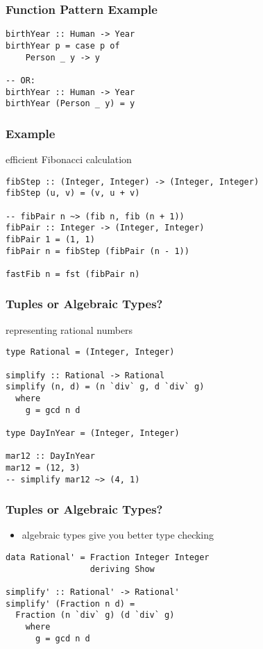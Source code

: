 \documentclass[dvipsnames]{beamer}
\theoremstyle{plain}
\begin{document}
\begin{frame}[fragile]
  \frametitle{Function Pattern Example}

  \begin{lstlisting}
birthYear :: Human -> Year
birthYear p = case p of
    Person _ y -> y

-- OR:
birthYear :: Human -> Year
birthYear (Person _ y) = y
  \end{lstlisting}
\end{frame}

\begin{frame}[fragile]
  \frametitle{Example}

  \begin{exampleblock}{efficient Fibonacci calculation}
    \begin{lstlisting}
fibStep :: (Integer, Integer) -> (Integer, Integer)
fibStep (u, v) = (v, u + v)

-- fibPair n ~> (fib n, fib (n + 1))
fibPair :: Integer -> (Integer, Integer)
fibPair 1 = (1, 1)
fibPair n = fibStep (fibPair (n - 1))

fastFib n = fst (fibPair n)
    \end{lstlisting}
  \end{exampleblock}
\end{frame}


\begin{frame}[fragile]
  \frametitle{Tuples or Algebraic Types?}

  \begin{exampleblock}{representing rational numbers}
    \begin{lstlisting}
type Rational = (Integer, Integer)

simplify :: Rational -> Rational
simplify (n, d) = (n `div` g, d `div` g)
  where
    g = gcd n d

type DayInYear = (Integer, Integer)

mar12 :: DayInYear
mar12 = (12, 3)
-- simplify mar12 ~> (4, 1)
    \end{lstlisting}
  \end{exampleblock}
\end{frame}

\begin{frame}[fragile]
  \frametitle{Tuples or Algebraic Types?}

  \begin{itemize}
    \item algebraic types give you better type checking
  \end{itemize}

  \bigskip
  \begin{lstlisting}
data Rational' = Fraction Integer Integer
                 deriving Show

simplify' :: Rational' -> Rational'
simplify' (Fraction n d) =
  Fraction (n `div` g) (d `div` g)
    where
      g = gcd n d
  \end{lstlisting}
\end{frame}
\end{document}
